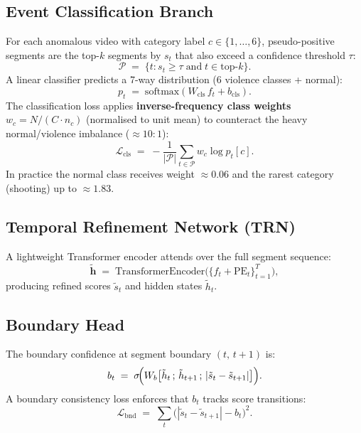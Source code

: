 \documentclass[sigconf,nonacm]{acmart}
\begin{document}
\subsection{Event Classification Branch}

For each anomalous video with category label $c\in\{1,\ldots,6\}$,
pseudo-positive segments are the top-$k$ segments by $s_t$ that also
exceed a confidence threshold $\tau$:
\begin{equation}
  \mathcal{P} \;=\; \bigl\{t : s_t \geq \tau \;\text{and}\;
                    t \in \mathrm{top}\text{-}k\bigr\}.
\end{equation}
A linear classifier predicts a 7-way distribution (6 violence classes + normal):
\begin{equation}
  p_t \;=\; \mathrm{softmax}(W_\mathrm{cls}\,f_t + b_\mathrm{cls}).
\end{equation}
The classification loss applies \textbf{inverse-frequency class weights}
$w_c = N/(C \cdot n_c)$ (normalised to unit mean) to counteract
the heavy normal/violence imbalance (${\approx}10{:}1$):
\begin{equation}
  \mathcal{L}_\mathrm{cls} \;=\;
    -\frac{1}{|\mathcal{P}|}\sum_{t\in\mathcal{P}} w_c \log p_t[c].
\end{equation}
In practice the normal class receives weight ${\approx}0.06$ and the
rarest category (shooting) up to ${\approx}1.83$.

\subsection{Temporal Refinement Network (TRN)}

A lightweight Transformer encoder attends over the full segment sequence:
\begin{equation}
  \tilde{\mathbf{h}} \;=\;
    \mathrm{TransformerEncoder}\!\bigl(\{f_t + \mathrm{PE}_t\}_{t=1}^{T}\bigr),
\end{equation}
producing refined scores $\tilde{s}_t$ and hidden states $\tilde{h}_t$.

\subsection{Boundary Head}

The boundary confidence at segment boundary $(t,\,t{+}1)$ is:
\begin{equation}
  b_t \;=\; \sigma\!\Bigl(W_b\bigl[
      \tilde{h}_t\,;\,\tilde{h}_{t+1}\,;\,|\tilde{s}_t-\tilde{s}_{t+1}|
    \bigr]\Bigr).
\end{equation}
A boundary consistency loss enforces that $b_t$ tracks score transitions:
\begin{equation}
  \mathcal{L}_\mathrm{bnd} \;=\;
    \sum_t \bigl(|\tilde{s}_t - \tilde{s}_{t+1}| - b_t\bigr)^2.
\end{equation}
\end{document}
